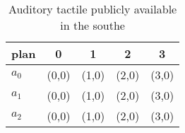 \documentclass[a4paper]{article}
\begin{document}
\begin{table}
\begin{adjustbox}{width=0.6\columnwidth}
\begin{tabular}{|l|l|l|l|l|}
\hline
\textbf{plan} & \multicolumn{1}{c|}{\textbf{0}} & \multicolumn{1}{c|}{\textbf{1}} & \multicolumn{1}{c|}{\textbf{2}} & \multicolumn{1}{c|}{\textbf{3}} \\ \hline
\textbf{$a_0$}  & (0,0) & (1,0) & (2,0) & (3,0) \\ \hline
\textbf{$a_1$}  & (0,0) & (1,0) & (2,0) & (3,0) \\ \hline
\textbf{$a_2$}  & (0,0) & (1,0) & (2,0) & (3,0) \\ \hline
\end{tabular}
\end{adjustbox}
\caption{Auditory tactile publicly available in the southe
}
\end{table}
\end{document}
